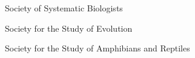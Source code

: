 \begin{tightItemize}
\item Society of Systematic Biologists
\item Society for the Study of Evolution
\item Society for the Study of Amphibians and Reptiles
\end{tightItemize}
